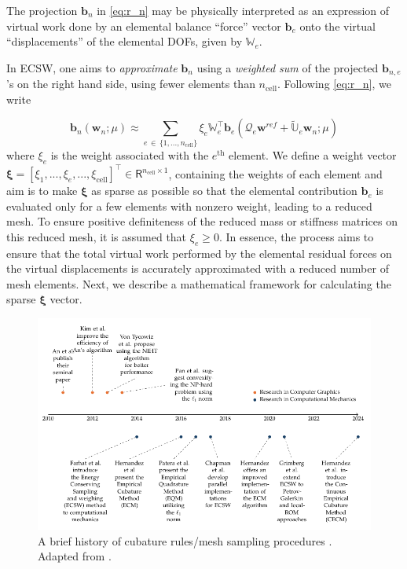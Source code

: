 \documentclass[11pt]{article}
\renewcommand{\vec}[1]{\mathbf{#1}}
\begin{document}
The projection $\vec{b}_n$ in \cref{eq:r_n} may be physically interpreted as an expression of virtual work done by an elemental balance ``force'' vector $\vec{b}_{e}$ onto the virtual ``displacements'' of the elemental DOFs, given by $\mathbb{W}_e$.


In ECSW, one aims to \textit{approximate} $\vec{b}_n$ using a \textit{weighted sum} of the projected $\vec{b}_{n,e}$'s on the right hand side, using fewer elements than $n_{\text{cell}}$.
Following \cref{eq:r_n}, we write


\begin{equation}
\vec{b}_n(\vec{w}_n; \mu) \approx \sum_{e\,\in\,\{1,...,n_{\text{cell}}\}} \xi_e \mathbb{W}_e^{\top} \vec{b}_e (\mathcal{Q}_e\vec{w}^{ref} + \widetilde{\mathbb{U}}_e\vec{w}_n; \mu)
\label{eq:r_n_approx}
\end{equation}
where $\xi_{e}$ is the weight associated with the $e^{\text{th}}$ element.
We define a weight vector $\boldsymbol{\xi}=\left[\xi_1,...,\xi_e,...,\xi_{\text{cell}}\right]^{\top}\in\mathsf{R}^{n_{\text{cell}}\times 1}$, containing the weights of each element and aim is to make $\boldsymbol{\xi} $ as sparse as possible so that the elemental contribution $\vec{b}_e$ is evaluated only for a few elements with nonzero weight, leading to a reduced mesh.
To ensure positive definiteness of the reduced mass or stiffness matrices on this reduced mesh, it is assumed that $\xi_e\geq 0$.
In essence, the process aims to ensure that the total virtual work performed by the elemental residual forces on the virtual displacements is accurately approximated with a reduced number of mesh elements.
Next, we describe a mathematical framework for calculating the sparse $\boldsymbol\xi$ vector.












\begin{figure}
    \centering
    \includegraphics[width=\linewidth]{PAT.pdf}
\caption{A brief history of cubature rules/mesh sampling procedures \cite{an2009optimizing,kim2013subspace,von2013efficient,pan2015subspace,farhat2014dimensional,chapman2016accelerated,Patera_2017_EQP,hernandez2020multiscale,grimberg2021mesh,hernandez2024cecm}. Adapted from \cite{bravo2024subspace}.}
\label{fig:PTA_LIT}
\end{figure}
\end{document}
